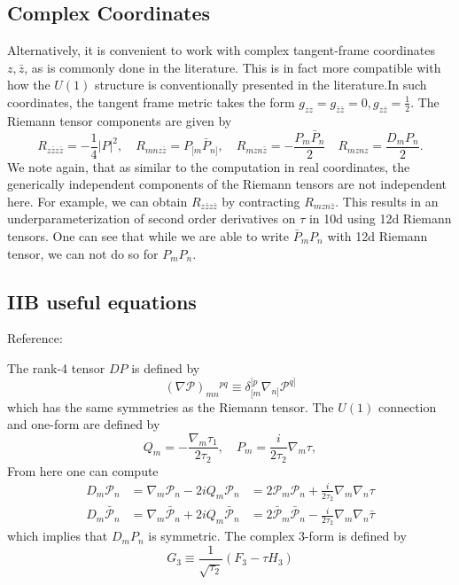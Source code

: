 \subsection{Complex Coordinates}
Alternatively, it is convenient to work with complex tangent-frame coordinates $z,\bar{z}$, as is commonly done in the literature.
This is in fact more compatible with how the $U(1)$ structure is conventionally presented in the literature.In such coordinates, the tangent frame metric takes the form $g_{zz} = g_{\bar{z}\bar{z}} = 0, g_{z\bar{z}} = \tfrac12$.
The Riemann tensor components are given by
\begin{equation}
R_{z\bar{z}z\bar{z}} = -\frac14 |P|^2,\quad
R_{mnz\bar{z}} = P_{[m}\bar{P}_{n]},\quad
R_{mzn\bar{z}} = - \frac{P_m \bar{P}_n}{2}\quad
R_{mznz} = \frac{D_m P_n}{2}.
\end{equation}
We note again, that as similar to the computation in real coordinates, the generically independent components of the Riemann tensors are not independent here. For example, we can obtain $R_{z\bar{z}z\bar{z}}$ by contracting $R_{mzn\bar{z}}$. 
This results in an underparameterization of second order derivatives on $\tau$ in 10d using 12d Riemann tensors.
One can see that while we are able to write $\bar{P}_m P_n$ with 12d Riemann tensor, we can not do so for $P_m P_n$. 

\subsection{IIB useful equations}

Reference: \cite{Policastro:2008hg,Minasian:2015bxa}

The rank-4 tensor $DP$ is defined by
\begin{equation}
(\nabla \mathcal{P})_{mn}{}^{pq} \equiv 
\delta_{[m}^{[p} \nabla_{n]}\mathcal{P}^{q]}
\end{equation}
which has the same symmetries as the Riemann tensor.
The $U(1)$ connection and one-form are defined by
\begin{equation}
Q_m =-\frac{\nabla_m\tau_1}{2\tau_2},\quad
P_m = \frac{i}{2\tau_2} \nabla_m \tau,
\end{equation}
From here one can compute
\begin{equation}
\begin{aligned}
D_m \mathcal{P}_n
&= \nabla_m \mathcal{P}_n - 2i Q_m \mathcal{P}_n
&= 2\mathcal{P}_m \mathcal{P}_n + \frac{i}{2\tau_2} \nabla_m \nabla_n \tau \\
D_m \bar{\mathcal{P}}_n
&= \nabla_m \bar{\mathcal{P}}_n + 2i Q_m \bar{\mathcal{P}}_n
&= 2\bar{\mathcal{P}}_m \bar{\mathcal{P}}_n - \frac{i}{2\tau_2} \nabla_m \nabla_n \bar{\tau}
\end{aligned}
\end{equation}
which implies that $D_m P_n$ is symmetric.
The complex 3-form is defined by
\begin{equation}
G_3 \equiv \frac{1}{\sqrt{\tau_2}} (F_3 - \tau H_3)
\end{equation}

